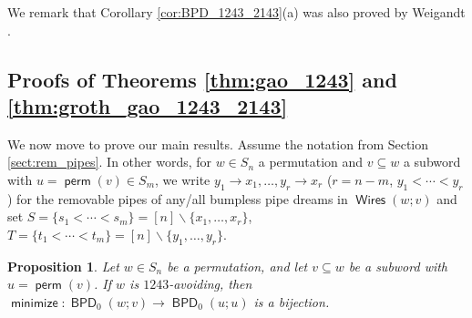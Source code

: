 \documentclass[11pt]{article}
\newtheorem{proposition}[theo]{Proposition}
\theoremstyle{definition}
\numberwithin{equation}{section}
\newcommand{\sseq}{\subseteq}
\newcommand{\sm}{\smallsetminus}
\DeclareMathOperator{\perm}{\mathsf{perm}}
\DeclareMathOperator{\minimize}{\mathsf{minimize}}
\DeclareMathOperator{\Wires}{\mathsf{Wires}}
\DeclareMathOperator{\BPD}{\mathsf{BPD}}
\begin{document}
We remark that Corollary \ref{cor:BPD_1243_2143}(a) was also proved by Weigandt \cite{Wei21}.



\subsection{Proofs of Theorems \ref{thm:gao_1243} and \ref{thm:groth_gao_1243_2143}}

We now move to prove our main results.
Assume the notation from Section \ref{sect:rem_pipes}.
In other words, for $w\in S_n$ a permutation and $v\sseq w$ a subword with $u = \perm(v) \in S_m$,
we write $y_1\to x_1,\dots,y_r\to x_r$ ($r = n-m$, $y_1<\cdots<y_r$) for the removable pipes of any/all bumpless pipe dreams in $\Wires(w;v)$ and set $S = \{s_1<\cdots<s_m\} = [n]\sm \{x_1,\dots,x_r\}$, $T = \{t_1<\cdots<t_m\} = [n]\sm \{y_1,\dots,y_r\}$.

\begin{proposition}
\label{prop:bpd_bij_1243}
    Let $w\in S_n$ be a permutation, and let $v\sseq w$ be a subword with $u = \perm(v)$.
    If $w$ is $1243$-avoiding, then
    $\minimize\colon \BPD_0(w;v) \to \BPD_0(u;u)$ is a bijection.
\end{proposition}
\end{document}
